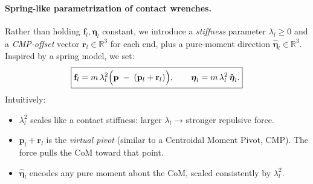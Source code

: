\documentclass[main.tex]{subfiles}
\begin{document}
\begin{sloppypar}
\paragraph{Spring-like parametrization of contact wrenches.}
Rather than holding $\mathbf{f}_l,\boldsymbol{\eta}_l$ constant, we introduce a \emph{stiffness} parameter $\lambda_l\ge0$ and a \emph{CMP‐offset} vector $\mathbf{r}_l\in\mathbb{R}^3$ for each end, plus a pure‐moment direction $\mathbf{\hat{\boldsymbol{\eta}}}_l\in\mathbb{R}^3$.  Inspired by a spring model, we set:
\begin{equation}\label{eq:stiff‐param}
\boxed{
\displaystyle
\mathbf{f}_l = m\,\lambda_l^2\Bigl(\mathbf{p} \;-\;(\mathbf{p}_l + \mathbf{r}_l)\Bigr),
\qquad
\boldsymbol{\eta}_l = m\,\lambda_l^2\,\mathbf{\hat{\boldsymbol{\eta}}}_l.
}
\end{equation}
Intuitively:
\begin{itemize}
  \item $\lambda_l^2$ scales like a contact stiffness: larger $\lambda_l$ → stronger repulsive force.
  \item $\mathbf{p}_l + \mathbf{r}_l$ is the \emph{virtual pivot} (similar to a Centroidal Moment Pivot, CMP).  The force pulls the CoM toward that point.
  \item $\mathbf{\hat{\boldsymbol{\eta}}}_l$ encodes any pure moment about the CoM, scaled consistently by $\lambda_l^2$.
\end{itemize}


\end{sloppypar}
\end{document}
